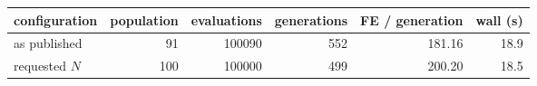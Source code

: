 \footnotesize
\setlength{\tabcolsep}{7pt}
\begin{tabular}{lrrrrr}
\toprule
configuration & population & evaluations & generations & FE / generation & wall (s) \\
\midrule
as published & 91 & 100090 & 552 & 181.16 & 18.9 \\
requested $N$ & 100 & 100000 & 499 & 200.20 & 18.5 \\
\bottomrule
\end{tabular}
